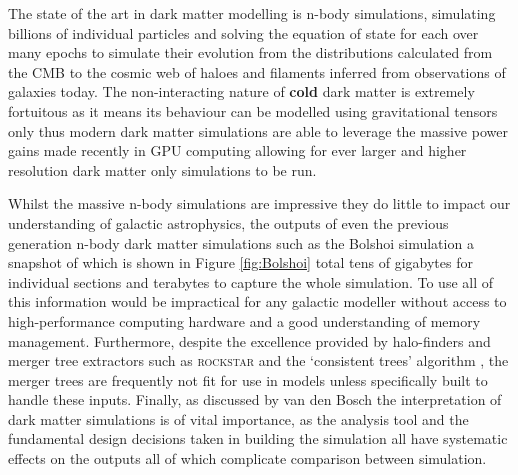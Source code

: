 The state of the art in dark matter modelling is n-body simulations, simulating billions of individual particles and solving the equation of state for each over many epochs to simulate their evolution from the distributions calculated from the CMB to the cosmic web of haloes and filaments inferred from observations of galaxies today. The non-interacting nature of \textbf{cold} dark matter is extremely fortuitous as it means its behaviour can be modelled using gravitational tensors only thus modern dark matter simulations are able to leverage the massive power gains made recently in GPU computing allowing for ever larger and higher resolution dark matter only simulations to be run. 

Whilst the massive n-body simulations are impressive they do little to impact our understanding of galactic astrophysics, the outputs of even the previous generation n-body dark matter simulations such as the Bolshoi simulation a snapshot of which is shown in Figure \ref{fig:Bolshoi} total tens of gigabytes for individual sections and terabytes to capture the whole simulation. To use all of this information would be impractical for any galactic modeller without access to high-performance computing hardware and a good understanding of memory management. Furthermore, despite the excellence provided by halo-finders and merger tree extractors such as \textsc{rockstar} \cite{Behroozi2013THECORES} and the `consistent trees' algorithm \cite{Behroozi2013GRAVITATIONALLYCOSMOLOGY}, the merger trees are frequently not fit for use in models unless specifically built to handle these inputs. Finally, as discussed by van den Bosch \cite{vandenBosch2014ComingWells, vandenBosch2017DissectingSimulation, vandenBosch2018DisruptionFiction} the interpretation of dark matter simulations is of vital importance, as the analysis tool and the fundamental design decisions taken in building the simulation all have systematic effects on the outputs all of which complicate comparison between simulation.

